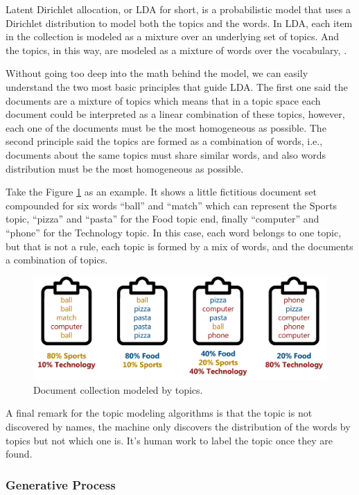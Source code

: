 	Latent Dirichlet allocation, or LDA for short, is a probabilistic model that uses a Dirichlet distribution to model both the topics and the words. In LDA, each item in the collection is modeled as a mixture over an underlying set of topics. And the topics, in this way, are modeled as a mixture of words over the vocabulary, \cite{blei2003latent}.
		
	Without going too deep into the math behind the model, we can easily understand the two most basic principles that guide LDA. The first one said the documents are a mixture of topics which means that in a topic space each document could be interpreted as a linear combination of these topics, however, each one of the documents must be the most homogeneous as possible. The second principle said the topics are formed as a combination of words, i.e., documents about the same topics must share similar words, and also words distribution must be the most homogeneous as possible.
	
	Take the Figure \ref{fig:topicmodeling} as an example. It shows a little fictitious document set compounded for six words ``ball'' and ``match'' which can represent the Sports topic, ``pizza'' and ``pasta'' for the Food topic end, finally ``computer'' and ``phone'' for the Technology  topic. In this case, each word belongs to one topic, but that is not a rule, each topic is formed by a mix of words, and the documents a combination of topics.
	
	\begin{figure}[h!]
		\centering
		\includegraphics[width=\linewidth]{01.Chapters/02.Background/topic_modeling}
		\caption{Document collection modeled by topics.}
		\label{fig:topicmodeling}
	\end{figure}
		
	A final remark for the topic modeling algorithms is that the topic is not discovered by names, the machine only discovers the distribution of the words by topics but not which one is. It's human work to label the topic once they are found.
	
	\subsubsection{Generative Process}
	
